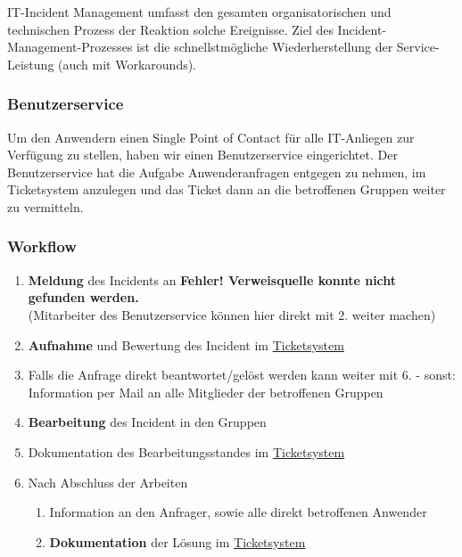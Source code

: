 \documentclass[]{article}
\begin{document}
IT-Incident Management umfasst den gesamten organisatorischen und
technischen Prozess der Reaktion solche Ereignisse. Ziel des
Incident-Management-Prozesses ist die schnellstmögliche
Wiederherstellung der Service-Leistung (auch mit Workarounds).

\subsubsection{Benutzerservice}\label{benutzerservice}

Um den Anwendern einen Single Point of Contact für alle IT-Anliegen zur
Verfügung zu stellen, haben wir einen Benutzerservice eingerichtet. Der
Benutzerservice hat die Aufgabe Anwenderanfragen entgegen zu nehmen, im
Ticketsystem anzulegen und das Ticket dann an die betroffenen Gruppen
weiter zu vermitteln.

\subsubsection{Workflow}\label{workflow-1}

\begin{enumerate}
\def\labelenumi{\arabic{enumi}.}
\item
  \textbf{Meldung} des Incidents an \textbf{Fehler! Verweisquelle konnte
  nicht gefunden werden.}\\
  (Mitarbeiter des Benutzerservice können hier direkt mit 2. weiter
  machen)
\item
  \textbf{Aufnahme} und Bewertung des Incident im
  \href{https://docs.google.com/spreadsheets/d/1GDq3AEsVDu1a-X7tEl6qKDtSZdAXm8lsRzY6Ijw-dUQ/edit\#gid=0}{Ticketsystem}
\item
  Falls die Anfrage direkt beantwortet/gelöst werden kann weiter mit 6.
  - sonst:\\
  Information per Mail an alle Mitglieder der betroffenen Gruppen
\item
  \textbf{Bearbeitung} des Incident in den Gruppen
\item
  Dokumentation des Bearbeitungsstandes im
  \href{https://docs.google.com/spreadsheets/d/1GDq3AEsVDu1a-X7tEl6qKDtSZdAXm8lsRzY6Ijw-dUQ/edit\#gid=0}{Ticketsystem}
\item
  Nach Abschluss der Arbeiten

  \begin{enumerate}
  \def\labelenumii{\alph{enumii}.}
  \item
    Information an den Anfrager, sowie alle direkt betroffenen Anwender
  \item
    \textbf{Dokumentation} der Lösung im
    \href{https://docs.google.com/spreadsheets/d/1GDq3AEsVDu1a-X7tEl6qKDtSZdAXm8lsRzY6Ijw-dUQ/edit\#gid=0}{Ticketsystem}
  \end{enumerate}
\end{enumerate}
\end{document}
